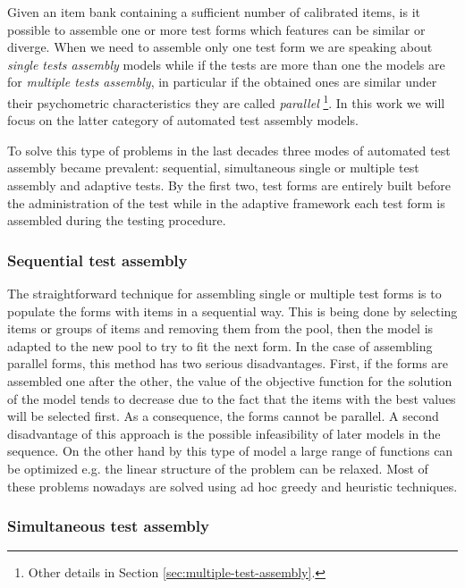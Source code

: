 Given an item bank containing a sufficient number of calibrated items, is it possible to assemble one or more test forms which features can be similar or diverge. When we need to assemble only one test form we are speaking about \emph{single tests assembly} models while if the tests are more than one the models are for \emph{multiple tests assembly}, in particular if the obtained ones are similar under their psychometric characteristics they are called \emph{parallel} \footnote{Other details in Section \ref{sec:multiple-test-assembly}.}.
In this work we will focus on the latter category of automated test assembly models.


To solve this type of problems in the last decades three modes of automated test assembly became prevalent: sequential, simultaneous single or multiple test assembly and adaptive tests.
By the first two, test forms are entirely built before the administration of the test while in the adaptive framework each test form is assembled during the testing procedure.


\subsubsection{Sequential test assembly}

The straightforward technique for assembling single or multiple test forms is
to populate the forms with items in a sequential way. This is being done by
selecting items or groups of items and removing them from the pool, then the
model is adapted to the new pool to try to fit the next form. In the case of assembling parallel forms, this method
has two serious disadvantages. First, if the forms are assembled one after the
other, the value of the objective function for the solution of the model tends
to decrease due to the fact that the items with the best values will be selected
first. As a consequence, the forms cannot be parallel. A second disadvantage of
this approach is the possible infeasibility of later models in the sequence. On
the other hand by this type of model a large range of functions can be
optimized e.g. the linear structure of the problem can be relaxed. Most of these
problems nowadays are solved using ad hoc greedy and heuristic techniques.


\subsubsection{Simultaneous test assembly}

